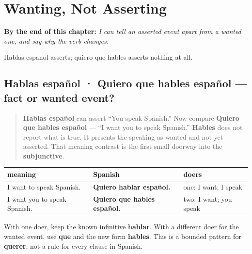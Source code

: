 
\chapter{Wanting, Not Asserting}
\label{ch:spanish-quiero-que}

\begin{chapteropening}
\textbf{By the end of this chapter:} \emph{I can tell an asserted event apart from a wanted one, and say why the verb changes.}

Hablas espanol asserts; quiero que hables asserts nothing at all.
\end{chapteropening}

\section[Hablas español · Quiero que hables español]{Hablas español · Quiero que hables español — fact or wanted event?}

\label{lesson:ES-C18-quiero-que}



\begin{quote}
\textbf{Hablas español} can assert “You speak Spanish.” Now compare \textbf{Quiero que hables español} — “I want you to speak Spanish.” \textbf{Hables} does not report what is true. It presents the speaking as wanted and not yet asserted. That meaning contrast is the first small doorway into the \textbf{subjunctive}.
\end{quote}

\begin{grammarlens}[title={Grammar Lens: count the doers}]
\noindent
\begin{tabularx}{\linewidth}{@{}>{\raggedright\arraybackslash}X>{\raggedright\arraybackslash}X>{\raggedright\arraybackslash}X@{}}
\toprule
\textbf{meaning} & \textbf{Spanish} & \textbf{doers} \\
\midrule
I want to speak Spanish. & \textbf{Quiero hablar español.} & one: I want; I speak \\
I want you to speak Spanish. & \textbf{Quiero que hables español.} & two: I want; you speak \\
\bottomrule
\end{tabularx}

With one doer, keep the known infinitive \textbf{hablar}. With a different doer for the wanted event, use \textbf{que} and the new form \textbf{hables}. This is a bounded pattern for \textbf{querer}, not a rule for every clause in Spanish.
\end{grammarlens}

